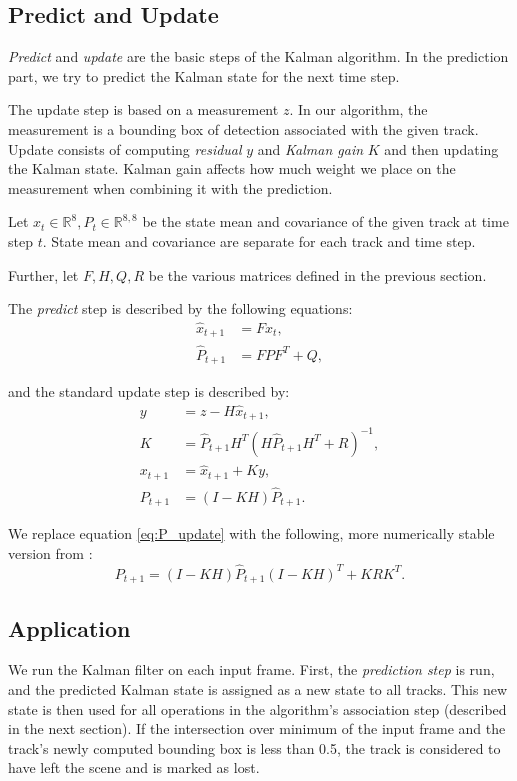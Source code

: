 \subsection{Predict and Update}

\textit{Predict} and \textit{update} are the basic steps of the Kalman algorithm. In the prediction part, we try to predict the Kalman state for the next time step.

The update step is based on a measurement $z$. In our algorithm, the measurement is a bounding box of detection associated with the given track. Update consists of computing \textit{residual} $y$ and \textit{Kalman gain} $K$ and then updating the Kalman state. Kalman gain affects how much weight we place on the measurement when combining it with the prediction.

Let $x_t \in \mathbb{R}^8, P_t \in \mathbb{R}^{8,8}$ be the state mean and covariance of the given track at time step $t$. State mean and covariance are separate for each track and time step.

Further, let $F, H, Q, R$ be the various matrices defined in the previous section.

The \textit{predict} step is described by the following equations:
\begin{align}
    \hat{x}_{t+1} &= Fx_t , \\
    \hat{P}_{t+1} &= FPF^T + Q,
\end{align}

and the standard update step is described by:
\begin{align}
    y &= z - H\hat{x}_{t+1} ,\\
    K &= \hat{P}_{t+1} H^T (H \hat{P}_{t+1} H^T + R)^{-1} ,\\
    x_{t+1} &= \hat{x}_{t+1} + Ky ,\\
    P_{t+1} &= (I - KH)\hat{P}_{t+1} .\label{eq:P_update}
\end{align}

We replace equation \ref{eq:P_update} with the following, more numerically stable version from \cite{appliedKalman}:
$$
P_{t+1} = (I - KH)\hat{P}_{t+1}(I - KH)^T + KRK^T.
$$
 
 
\subsection{Application}

We run the Kalman filter on each input frame. First, the \textit{prediction step} is run, and the predicted Kalman state is assigned as a new state to all tracks. This new state is then used for all operations in the algorithm's association step (described in the next section). If the intersection over minimum of the input frame and the track's newly computed bounding box is less than 0.5, the track is considered to have left the scene and is marked as lost.


